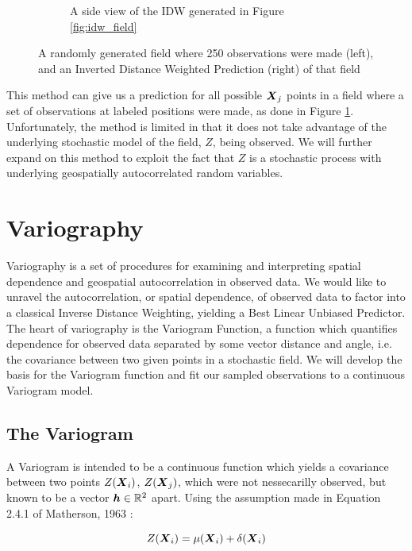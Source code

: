 \documentclass[11pt]{ucthesis}
\newcommand{\vect}[1]{{\it{\boldsymbol{#1}}}}
\begin{document}
\begin{figure}[ht!]
\begin{subfigure}[t]{0.5\textwidth}
        \captionsetup{skip=0.5\baselineskip, width=0.8\textwidth, size=footnotesize}
        \caption{A side view of the IDW generated in Figure \ref{fig:idw_field}}
    \end{subfigure}
    \captionsetup{skip=0.5\baselineskip,size=footnotesize}
    \caption{A randomly generated field where 250 observations were made (left), and an Inverted Distance Weighted Prediction (right) of that field}
    \label{fig:idw_side_by_side}
\end{figure}

This method can give us a prediction for all possible $\vect{X}_j$ points in a field where a set of observations at labeled positions were made, as done in Figure \ref{fig:idw_side_by_side}. Unfortunately, the method is limited in that it does not take advantage of the underlying stochastic model of the field, $Z$, being observed. We will further expand on this method to exploit the fact that $Z$ is a stochastic process with underlying geospatially autocorrelated random variables.

\section{Variography}
Variography is a set of procedures for examining and interpreting spatial dependence and geospatial autocorrelation in observed data. We would like to unravel the autocorrelation, or spatial dependence, of observed data to factor into a classical Inverse Distance Weighting, yielding a Best Linear Unbiased Predictor. The heart of variography is the Variogram Function, a function which quantifies dependence for observed data separated by some vector distance and angle, i.e. the covariance between two given points in a stochastic field. We will develop the basis for the Variogram function and fit our sampled observations to a continuous Variogram model.

\subsection{The Variogram}
A Variogram is intended to be a continuous function which yields a covariance between two points $Z(\vect{X}_{i})$, $Z(\vect{X}_{j})$, which were not nessecarilly observed, but known to be a vector $\vect{h} \in \mathbb{R}^2$ apart. Using the assumption made in Equation 2.4.1 of Matherson, 1963 \cite{matheron:geostat}:

\begin{equation}
    Z(\vect{X}_i)=\mu(\vect{X}_i)+\delta(\vect{X}_i)
    \label{eq:matheron:assum}
\end{equation}
\end{document}
